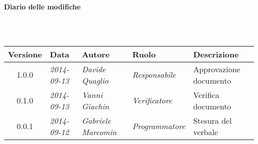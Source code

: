 \noindent\begin{Large}\textbf{Diario delle modifiche}\end{Large}\\
\\
\begin{small}
\begin{tabular}{|c|p{1.8cm}|p{2.8cm}|p{2.8cm}|p{3.5cm}|}
\hline
Versione & Data & Autore & Ruolo & Descrizione \\
\hline
\hline
1.0.0 & \textit{2014-09-13} & \textit{Davide Quaglio} & \textit{Responsabile} &  Approvazione documento\\
\hline
0.1.0 & \textit{2014-09-13} & \textit{Vanni Giachin} & \textit{Verificatore} &  Verifica documento\\
\hline
0.0.1 & \textit{2014-09-12} & \textit{Gabriele Marcomin} & \textit{Programmatore} &  Stesura del verbale\\
\hline
\end{tabular}\\
\end{small}